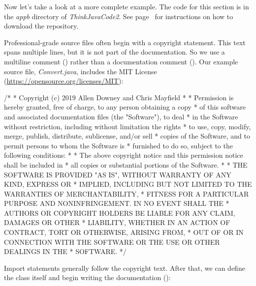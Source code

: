 Now let's take a look at a more complete example.
The code for this section is in the {\it appb} directory of {\it ThinkJavaCode2}.
See page~\pageref{code} for instructions on how to download the repository.

Professional-grade source files often begin with a copyright statement.
This text spans multiple lines, but it is not part of the documentation.
So we use a multiline comment (\java{/*}) rather than a documentation comment (\java{/**}).
Our example source file, {\it Convert.java}, includes the MIT License (\url{https://opensource.org/licenses/MIT}):


\begin{scriptsize}
\begin{code}
/*
 * Copyright (c) 2019 Allen Downey and Chris Mayfield
 *
 * Permission is hereby granted, free of charge, to any person obtaining a copy
 * of this software and associated documentation files (the "Software"), to deal
 * in the Software without restriction, including without limitation the rights
 * to use, copy, modify, merge, publish, distribute, sublicense, and/or sell
 * copies of the Software, and to permit persons to whom the Software is
 * furnished to do so, subject to the following conditions:
 *
 * The above copyright notice and this permission notice shall be included in
 * all copies or substantial portions of the Software.
 *
 * THE SOFTWARE IS PROVIDED "AS IS", WITHOUT WARRANTY OF ANY KIND, EXPRESS OR
 * IMPLIED, INCLUDING BUT NOT LIMITED TO THE WARRANTIES OF MERCHANTABILITY,
 * FITNESS FOR A PARTICULAR PURPOSE AND NONINFRINGEMENT. IN NO EVENT SHALL THE
 * AUTHORS OR COPYRIGHT HOLDERS BE LIABLE FOR ANY CLAIM, DAMAGES OR OTHER
 * LIABILITY, WHETHER IN AN ACTION OF CONTRACT, TORT OR OTHERWISE, ARISING FROM,
 * OUT OF OR IN CONNECTION WITH THE SOFTWARE OR THE USE OR OTHER DEALINGS IN THE
 * SOFTWARE.
 */
\end{code}
\end{scriptsize}

Import statements generally follow the copyright text.
After that, we can define the class itself and begin writing the documentation (\java{/**}):

\begin{code}
import java.util.Scanner;

/**
 * Methods for converting to/from the metric system.
 *
 * @author Allen Downey
 * @author Chris Mayfield
 * @version 6.1.5
 */
public class Convert {
\end{code}

